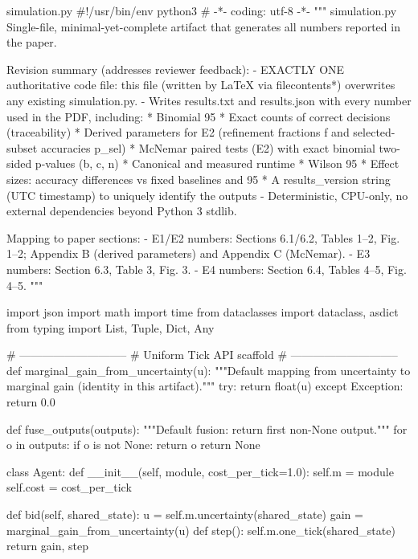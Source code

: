 \begin{filecontents*}{simulation.py}
#!/usr/bin/env python3
# -*- coding: utf-8 -*-
"""
simulation.py
Single-file, minimal-yet-complete artifact that generates all numbers reported in the paper.

Revision summary (addresses reviewer feedback):
- EXACTLY ONE authoritative code file: this file (written by LaTeX via filecontents*) overwrites any existing simulation.py.
- Writes results.txt and results.json with every number used in the PDF, including:
  * Binomial 95%
  * Exact counts of correct decisions (traceability)
  * Derived parameters for E2 (refinement fractions f and selected-subset accuracies p_sel)
  * McNemar paired tests (E2) with exact binomial two-sided p-values (b, c, n)
  * Canonical and measured runtime
  * Wilson 95%
  * Effect sizes: accuracy differences vs fixed baselines and 95%
  * A results_version string (UTC timestamp) to uniquely identify the outputs
- Deterministic, CPU-only, no external dependencies beyond Python 3 stdlib.

Mapping to paper sections:
- E1/E2 numbers: Sections 6.1/6.2, Tables 1–2, Fig. 1–2; Appendix B (derived parameters) and Appendix C (McNemar).
- E3 numbers: Section 6.3, Table 3, Fig. 3.
- E4 numbers: Section 6.4, Tables 4–5, Fig. 4–5.
"""

import json
import math
import time
from dataclasses import dataclass, asdict
from typing import List, Tuple, Dict, Any


# -----------------------------
# Uniform Tick API scaffold
# -----------------------------
def marginal_gain_from_uncertainty(u):
    """Default mapping from uncertainty to marginal gain (identity in this artifact)."""
    try:
        return float(u)
    except Exception:
        return 0.0


def fuse_outputs(outputs):
    """Default fusion: return first non-None output."""
    for o in outputs:
        if o is not None:
            return o
    return None


class Agent:
    def __init__(self, module, cost_per_tick=1.0):
        self.m = module
        self.cost = cost_per_tick

    def bid(self, shared_state):
        u = self.m.uncertainty(shared_state)
        gain = marginal_gain_from_uncertainty(u)
        def step():
            self.m.one_tick(shared_state)
        return gain, step



\end{filecontents*}
